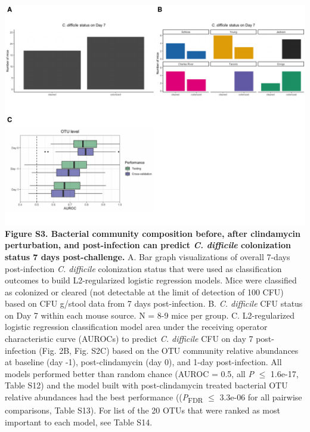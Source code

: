 \documentclass[
  11pt,
]{article}
\begin{document}
\includegraphics{figure_S3.pdf} \textbf{Figure S3. Bacterial community
composition before, after clindamycin perturbation, and post-infection
can predict \emph{C. difficile} colonization status 7 days
post-challenge.} A. Bar graph visualizations of overall 7-days
post-infection \emph{C. difficile} colonization status that were used as
classification outcomes to build L2-regularized logistic regression
models. Mice were classified as colonized or cleared (not detectable at
the limit of detection of 100 CFU) based on CFU g/stool data from 7 days
post-infection. B. \emph{C. difficile} CFU status on Day 7 within each
mouse source. N = 8-9 mice per group. C. L2-regularized logistic
regression classification model area under the receiving operator
characteristic curve (AUROCs) to predict \emph{C. difficile} CFU on day
7 post-infection (Fig. 2B, Fig. S2C) based on the OTU community relative
abundances at baseline (day -1), post-clindamycin (day 0), and 1-day
post-infection. All models performed better than random chance (AUROC =
0.5, all \emph{P} \(\le\) 1.6e-17, Table S12) and the model built with
post-clindamycin treated bacterial OTU relative abundances had the best
performance ((\emph{P}\textsubscript{FDR} \(\le\) 3.3e-06 for all
pairwise comparisons, Table S13). For list of the 20 OTUs that were
ranked as most important to each model, see Table S14.

\newpage
\end{document}
